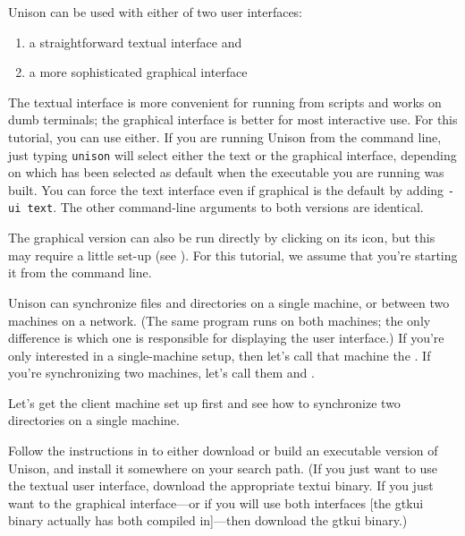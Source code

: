 \documentclass{article}
\begin{document}



Unison can be used with either of two user interfaces:
\begin{enumerate}
\item a straightforward textual interface and
\item a more sophisticated graphical interface
\end{enumerate}
The textual interface is more convenient for running from scripts and
works on dumb terminals; the graphical interface is better for most
interactive use.  For this tutorial, you can use either.  If you are running
Unison from the command line, just typing {\tt unison}
will select either the text or the graphical interface, depending on which
has been selected as default when the executable you are running was
built.  You can force the text interface even if graphical is the default by
adding {\tt -ui text}.
The other command-line arguments to both versions are identical.

The graphical version can also be run directly by clicking on its icon, but
this may require a little set-up (see ).  For this tutorial, we assume that you're starting it from the
command line.

Unison can synchronize files and directories on a single machine, or
between two machines on a network.  (The same program runs on both
machines; the only difference is which one is responsible for
displaying the user interface.)  If you're only interested in a
single-machine setup, then let's call that machine the \CLIENT{}.  If
you're synchronizing two machines, let's call them \CLIENT{} and
\SERVER.


Let's get the client machine set up first and see how to synchronize
two directories on a single machine.

Follow the instructions in  to either
download or build an executable version of Unison, and install it
somewhere on your search path.  (If you just want to use the textual user
interface, download the appropriate textui binary.  If you just want to
the graphical interface---or if you will use both interfaces [the gtkui
binary actually has both compiled in]---then download the gtkui binary.)
\end{document}
